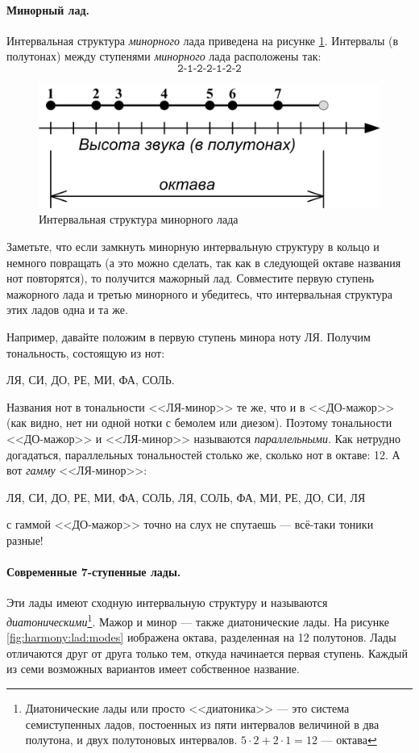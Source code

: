 \paragraph{Минорный лад.} Интервальная структура \emph{минорного} лада приведена на рисунке \ref{fig:harmony:lad:mode:min}. Интервалы (в полутонах) между ступенями \emph{минорного} лада расположены так:
\[
    \texttt{2-1-2-2-1-2-2}
\]

\begin{figure}[!ht]
    \centering
    \includegraphics{fig/intervals/mode-min} 
    \caption{Интервальная структура минорного лада}\label{fig:harmony:lad:mode:min}
\end{figure} 

Заметьте, что если замкнуть минорную интервальную структуру в кольцо и немного повращать (а это можно сделать, так как в следующей октаве названия нот повторятся), то получится мажорный лад. Совместите первую ступень мажорного лада и третью минорного и убедитесь, что интервальная структура этих ладов одна и та же. 

Например, давайте положим в первую ступень минора ноту ЛЯ. Получим тональность, состоящую из нот:
\begin{center}
    ЛЯ, СИ, ДО, РЕ, МИ, ФА, СОЛЬ.
\end{center}

Названия нот в тональности <<ЛЯ-минор>> те же, что и в <<ДО-мажор>> (как видно, нет ни одной нотки с бемолем или диезом). Поэтому тональности <<ДО-мажор>> и <<ЛЯ-минор>> называются \emph{параллельными}. Как нетрудно догадаться, параллельных тональностей столько же, сколько нот в октаве: 12. А вот \emph{гамму} <<ЛЯ-минор>>:
\begin{center}
    ЛЯ, СИ, ДО, РЕ, МИ, ФА, СОЛЬ, ЛЯ, СОЛЬ, ФА, МИ, РЕ, ДО, СИ, ЛЯ
\end{center}
с гаммой <<ДО-мажор>> точно на слух не спутаешь --- всё-таки тоники разные!

\paragraph{Современные 7-ступенные лады.} Эти лады имеют сходную интервальную структуру и называются \emph{диатоническими}\footnote{Диатонические лады или просто <<диатоника>> --- это система семиступенных ладов, постоенных из пяти интервалов величиной в два полутона, и двух полутоновых интервалов. $5\cdot2 + 2\cdot 1 = 12$ --- октава}. Мажор и минор --- также диатонические лады. На рисунке \ref{fig:harmony:lad:modes} иображена октава, разделенная на 12 полутонов. Лады отличаются друг от друга только тем, откуда начинается первая ступень. Каждый из семи возможных вариантов имеет собственное название. 

